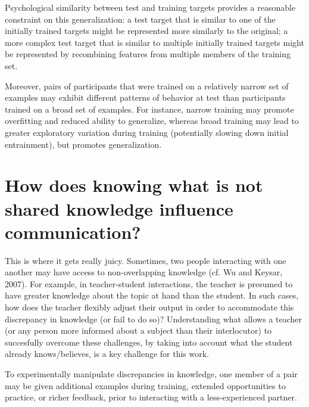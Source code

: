 \documentclass[12pt]{article}
\begin{document}
Psychological similarity between test and training targets provides a reasonable constraint on this generalization: a test target that is similar to one of the initially trained targets might be represented more similarly to the original; a more complex test target that is similar to multiple initially trained targets might be represented by recombining features from multiple members of the training set. 

Moreover, pairs of participants that were trained on a relatively narrow set of examples may exhibit different patterns of behavior at test than participants trained on a broad set of examples. For instance, narrow training may promote overfitting and reduced ability to generalize, whereas broad training may lead to greater exploratory variation during training (potentially slowing down initial entrainment), but promotes generalization. 

\section{How does knowing what is not shared knowledge influence communication? }

This is where it gets really juicy. Sometimes, two people interacting with one another may have access to non-overlapping knowledge (cf. Wu and Keysar, 2007). For example, in teacher-student interactions, the teacher is presumed to have greater knowledge about the topic at hand than the student. In such cases, how does the teacher flexibly adjust their output in order to accommodate this discrepancy in knowledge (or fail to do so)? Understanding what allows a teacher (or any person more informed about a subject than their interlocutor) to succesfully overcome these challenges, by taking into account what the student already knows/believes, is a key challenge for this work. 

To experimentally manipulate discrepancies in knowledge, one member of a pair may be given additional examples during training, extended opportunities to practice, or richer feedback, prior to interacting with a less-experienced partner. 


\setlength{\bibleftmargin}{.125in}
\setlength{\bibindent}{-\bibleftmargin}

\end{document}

